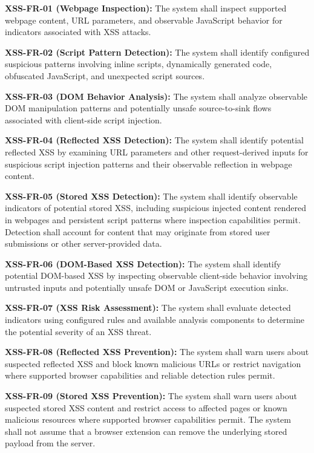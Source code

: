 \documentclass[12pt,a4paper]{report}
\begin{document}
\textbf{XSS-FR-01 (Webpage Inspection):} The system shall inspect supported webpage content, URL parameters, and observable JavaScript behavior for indicators associated with XSS attacks.\par

\textbf{XSS-FR-02 (Script Pattern Detection):} The system shall identify configured suspicious patterns involving inline scripts, dynamically generated code, obfuscated JavaScript, and unexpected script sources.\par

\textbf{XSS-FR-03 (DOM Behavior Analysis):} The system shall analyze observable DOM manipulation patterns and potentially unsafe source-to-sink flows associated with client-side script injection.\par

\textbf{XSS-FR-04 (Reflected XSS Detection):} The system shall identify potential reflected XSS by examining URL parameters and other request-derived inputs for suspicious script injection patterns and their observable reflection in webpage content.\par

\textbf{XSS-FR-05 (Stored XSS Detection):} The system shall identify observable indicators of potential stored XSS, including suspicious injected content rendered in webpages and persistent script patterns where inspection capabilities permit. Detection shall account for content that may originate from stored user submissions or other server-provided data.\par

\textbf{XSS-FR-06 (DOM-Based XSS Detection):} The system shall identify potential DOM-based XSS by inspecting observable client-side behavior involving untrusted inputs and potentially unsafe DOM or JavaScript execution sinks.\par

\textbf{XSS-FR-07 (XSS Risk Assessment):} The system shall evaluate detected indicators using configured rules and available analysis components to determine the potential severity of an XSS threat.\par

\textbf{XSS-FR-08 (Reflected XSS Prevention):} The system shall warn users about suspected reflected XSS and block known malicious URLs or restrict navigation where supported browser capabilities and reliable detection rules permit.\par

\textbf{XSS-FR-09 (Stored XSS Prevention):} The system shall warn users about suspected stored XSS content and restrict access to affected pages or known malicious resources where supported browser capabilities permit. The system shall not assume that a browser extension can remove the underlying stored payload from the server.\par
\end{document}
